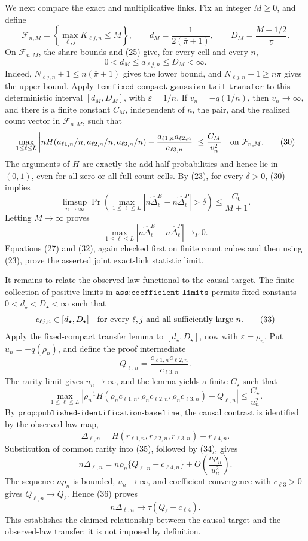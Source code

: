 We next compare the exact and multiplicative links.  Fix an integer \(M\geq0\), and define
\[
\mathcal F_{n,M}=\left\{\max_{\ell,j}K_{\ell j,n}\leq M\right\},
\qquad
d_M=\frac1{2(\overline\pi+1)},
\qquad
D_M=\frac{M+1/2}{\underline\pi}.
\tag{28}
\]
On \(\mathcal F_{n,M}\), the share bounds and (25) give, for every cell and every \(n\),
\[
0<d_M\leq a_{\ell j,n}\leq D_M<\infty.
\tag{29}
\]
Indeed, \(N_{\ell j,n}+1\leq n(\overline\pi+1)\) gives the lower bound, and \(N_{\ell j,n}+1\geq n\underline\pi\) gives the upper bound.  Apply \(\texttt{lem:fixed-compact-gaussian-tail-transfer}\) to this deterministic interval \([d_M,D_M]\), with \(\varepsilon=1/n\).  If \(v_n=-q(1/n)\), then \(v_n\to\infty\), and there is a finite constant \(C_M\), independent of \(n\), the pair, and the realized count vector in \(\mathcal F_{n,M}\), such that
\[
\max_{1\leq\ell\leq L}
\left|
nH(a_{\ell1,n}/n,a_{\ell2,n}/n,a_{\ell3,n}/n)
-\frac{a_{\ell1,n}a_{\ell2,n}}{a_{\ell3,n}}
\right|
\leq\frac{C_M}{v_n^2}
\quad\hbox{on }\mathcal F_{n,M}.
\tag{30}
\]
The arguments of \(H\) are exactly the add-half probabilities and hence lie in \((0,1)\), even for all-zero or all-full count cells.  By (23), for every \(\delta>0\), (30) implies
\[
\limsup_{n\to\infty}
\Pr\!\left(
\max_{1\leq\ell\leq L}
|n\widehat\Delta^E_{\ell}-n\widehat\Delta^P_{\ell}|>\delta
\right)
\leq\frac{C_0}{M+1}.
\tag{31}
\]
Letting \(M\to\infty\) proves
\[
\max_{1\leq\ell\leq L}
|n\widehat\Delta^E_{\ell}-n\widehat\Delta^P_{\ell}|
\longrightarrow_P0.
\tag{32}
\]
Equations (27) and (32), again checked first on finite count cubes and then using (23), prove the asserted joint exact-link statistic limit.

It remains to relate the observed-law functional to the causal target.  The finite collection of positive limits in \(\texttt{ass:coefficient-limits}\) permits fixed constants \(0<d_\star<D_\star<\infty\) such that
\[
c_{\ell j,n}\in[d_\star,D_\star]
\quad\hbox{for every }\ell,j\hbox{ and all sufficiently large }n.
\tag{33}
\]
Apply the fixed-compact transfer lemma to \([d_\star,D_\star]\), now with \(\varepsilon=\rho_n\).  Put \(u_n=-q(\rho_n)\), and define the proof intermediate
\[
Q_{\ell,n}=\frac{c_{\ell1,n}c_{\ell2,n}}{c_{\ell3,n}}.
\]
The rarity limit gives \(u_n\to\infty\), and the lemma yields a finite \(C_\star\) such that
\[
\max_{1\leq\ell\leq L}
\left|
\rho_n^{-1}H(\rho_nc_{\ell1,n},\rho_nc_{\ell2,n},\rho_nc_{\ell3,n})
-Q_{\ell,n}
\right|
\leq\frac{C_\star}{u_n^2}.
\tag{34}
\]
By \(\texttt{prop:published-identification-baseline}\), the causal contrast is identified by the observed-law map,
\[
\Delta_{\ell,n}
=H(r_{\ell1,n},r_{\ell2,n},r_{\ell3,n})-r_{\ell4,n}.
\tag{35}
\]
Substitution of common rarity into (35), followed by (34), gives
\[
n\Delta_{\ell,n}
=n\rho_n\{Q_{\ell,n}-c_{\ell4,n}\}
+O\!\left(\frac{n\rho_n}{u_n^2}\right).
\tag{36}
\]
The sequence \(n\rho_n\) is bounded, \(u_n\to\infty\), and coefficient convergence with \(c_{\ell3}>0\) gives \(Q_{\ell,n}\to Q_{\ell}\).  Hence (36) proves
\[
n\Delta_{\ell,n}\longrightarrow
\tau(Q_{\ell}-c_{\ell4}).
\tag{37}
\]
This establishes the claimed relationship between the causal target and the observed-law transfer; it is not imposed by definition.

